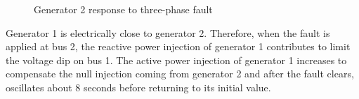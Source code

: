 \documentclass[a4paper, 12pt]{report}
\begin{document}
\begin{figure}[H]
  \centering
    \caption{Generator 2 response to three-phase fault}
\end{figure}

Generator 1 is electrically close to generator 2. Therefore, when the fault is applied at bus 2, the reactive power injection of generator 1 contributes to limit the voltage dip on bus 1. The active power injection of generator 1 increases to compensate the null injection coming from generator 2 and after the fault clears, oscillates about 8 seconds before returning to its initial value.
\end{document}
